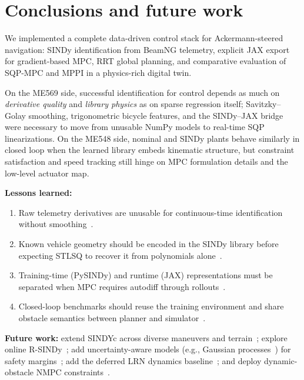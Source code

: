 \documentclass[letterpaper, 10 pt, conference]{ieeeconf}  %
\begin{document}
\section{Conclusions and future work}

We implemented a complete data-driven control stack for Ackermann-steered navigation: SINDy identification from BeamNG telemetry, explicit JAX export for gradient-based MPC, RRT global planning, and comparative evaluation of SQP-MPC and MPPI in a physics-rich digital twin.

On the ME569 side, successful identification for control depends as much on \emph{derivative quality} and \emph{library physics} as on sparse regression itself; Savitzky--Golay smoothing, trigonometric bicycle features, and the SINDy--JAX bridge were necessary to move from unusable NumPy models to real-time SQP linearizations.
On the ME548 side, nominal and SINDy plants behave similarly in closed loop when the learned library embeds kinematic structure, but constraint satisfaction and speed tracking still hinge on MPC formulation details and the low-level actuator map.

\textbf{Lessons learned:}
\begin{enumerate}
  \item Raw telemetry derivatives are unusable for continuous-time identification without smoothing~\cite{Brunton2016SINDy,Corbetta2020}.
  \item Known vehicle geometry should be encoded in the SINDy library before expecting STLSQ to recover it from polynomials alone~\cite{Corbetta2020}.
  \item Training-time (PySINDy) and runtime (JAX) representations must be separated when MPC requires autodiff through rollouts~\cite{Hewing2020}.
  \item Closed-loop benchmarks should reuse the training environment and share obstacle semantics between planner and simulator~\cite{Richter2014,Han2024Dynamics}.
\end{enumerate}

\textbf{Future work:} extend SINDYc across diverse maneuvers and terrain~\cite{Brunton2016SINDYc}; explore online R-SINDy~\cite{RSINDy}; add uncertainty-aware models (e.g., Gaussian processes~\cite{Sathe2024}) for safety margins~\cite{Hewing2020,Koller2018}; add the deferred LRN dynamics baseline~\cite{Zolman2025,Menegatti2025}; and deploy dynamic-obstacle NMPC constraints~\cite{Sani2021,Lindqvist2020,Du2024}.
\end{document}
